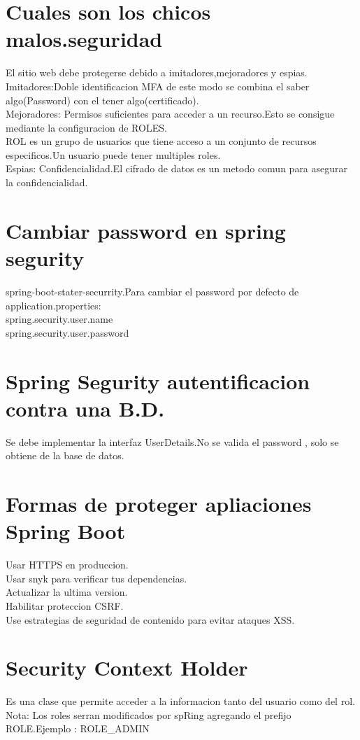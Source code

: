 \section{Cuales son los chicos malos.seguridad}
El sitio web debe protegerse debido a imitadores,mejoradores y espias.\\
Imitadores:Doble identificacion MFA de este modo se combina el saber algo(Password) con el tener algo(certificado).\\
Mejoradores: Permisos suficientes para acceder a un recurso.Esto se consigue mediante la configuracion de ROLES.\\
ROL es un grupo de usuarios que tiene acceso a un conjunto de recursos especificos.Un usuario puede tener multiples roles.\\
Espias: Confidencialidad.El cifrado de datos es un metodo comun para asegurar la confidencialidad.
\section{Cambiar password en spring segurity}
spring-boot-stater-securrity.Para cambiar el password por defecto de application.properties:\\
spring.security.user.name\\
spring.security.user.password
\section{Spring Segurity autentificacion contra una B.D.}
Se debe implementar la interfaz UserDetails.No se valida el password , solo se obtiene de la base de datos.
\section{Formas de proteger apliaciones Spring Boot}
Usar HTTPS en produccion.\\
Usar snyk para verificar tus dependencias.\\
Actualizar la ultima version.\\
Habilitar proteccion CSRF.\\
Use estrategias de seguridad de contenido para evitar ataques XSS.
\section{Security Context Holder}
Es una clase que permite acceder a la informacion tanto del usuario como del rol.\\
Nota: Los roles serran modificados por spRing agregando el prefijo ROLE.Ejemplo : ROLE\_ADMIN
